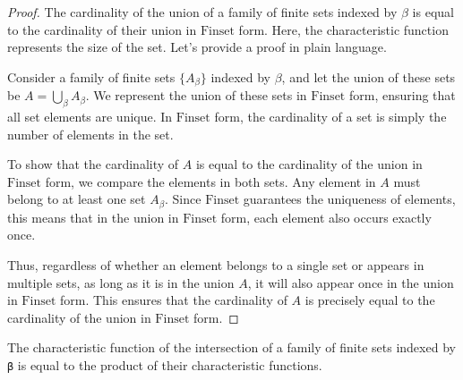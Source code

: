 \begin{proof}
    \leanok
The cardinality of the union of a family of finite sets indexed by \(\beta\) is equal to the cardinality of their union in \(\text{Finset}\) form. Here, the characteristic function represents the size of the set. Let's provide a proof in plain language.

Consider a family of finite sets \(\{A_\beta\}\) indexed by \(\beta\), and let the union of these sets be \(A = \bigcup_\beta A_\beta\). We represent the union of these sets in \(\text{Finset}\) form, ensuring that all set elements are unique. In \(\text{Finset}\) form, the cardinality of a set is simply the number of elements in the set.

To show that the cardinality of \(A\) is equal to the cardinality of the union in \(\text{Finset}\) form, we compare the elements in both sets. Any element in \(A\) must belong to at least one set \(A_\beta\). Since \(\text{Finset}\) guarantees the uniqueness of elements, this means that in the union in \(\text{Finset}\) form, each element also occurs exactly once.

Thus, regardless of whether an element belongs to a single set or appears in multiple sets, as long as it is in the union \(A\), it will also appear once in the union in \(\text{Finset}\) form. This ensures that the cardinality of \(A\) is precisely equal to the cardinality of the union in \(\text{Finset}\) form.

\end{proof}

\begin{lemma}\label{char_fun_FinInter}
  \leanok
  The characteristic function of the intersection of a family of finite sets indexed by \verb|β| is equal to the product of their characteristic functions.
\end{lemma}

